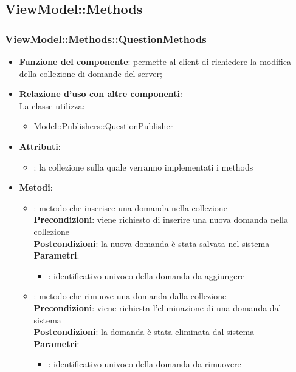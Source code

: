 \subsection{ViewModel::Methods}
\subsubsection{ViewModel::Methods::QuestionMethods}
\begin{itemize}
\item\textbf{Funzione del componente}: permette al client di richiedere la modifica della collezione di domande del server;
	\item\textbf{Relazione d'uso con altre componenti}: \\
La classe utilizza:
	\begin{itemize}
		\item Model::Publishers::QuestionPublisher
	\end{itemize}
\item\textbf{Attributi}:
	\begin{itemize}
		\item{}: la collezione sulla quale verranno implementati i methods\\
	\end{itemize}
\item\textbf{Metodi}:
	\begin{itemize}
		\item{}: metodo che inserisce una domanda nella collezione\\
		\textbf{Precondizioni}: viene richiesto di inserire una nuova domanda nella collezione\\
		\textbf{Postcondizioni}: la nuova domanda è stata salvata nel sistema\\
		\textbf{Parametri}:
			\begin{itemize}
				\item{}: identificativo univoco della domanda da aggiungere\\
			\end{itemize}
		\item{}: metodo che rimuove una domanda dalla collezione\\
		\textbf{Precondizioni}: viene richiesta l'eliminazione di una domanda dal sistema\\
		\textbf{Postcondizioni}: la domanda è stata eliminata dal sistema\\
		\textbf{Parametri}:
			\begin{itemize}
				\item{}: identificativo univoco della domanda da rimuovere\\
			\end{itemize}
	\end{itemize}
\end{itemize}

